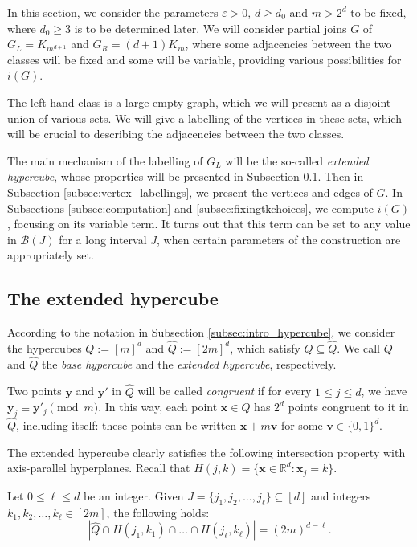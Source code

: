 \documentclass[10pt,a4paper]{article}
\numberwithin{equation}{section}
\newcommand{\rr}{\mathbb{R}}
\newcommand{\eps}{\varepsilon}
\newcommand{\cB}{\mathcal{B}}
\begin{document}
In this section, we consider the parameters $\eps>0$, $d\ge d_0$ and $m>2^d$ to be fixed, where $d_0\ge 3$ is to be determined later. We will consider partial joins $G$ of $G_L=\overline{K_{m^{d+1}}}$ and $G_R=(d+1)K_m$, where some adjacencies between the two classes will be fixed and some will be variable, providing various possibilities for $i(G)$.

The left-hand class is a large empty graph, which we will present as a disjoint union of various sets. We will give a labelling of the vertices in these sets, which will be crucial to describing the adjacencies between the two classes.

The main mechanism of the labelling of $G_L$ will be the so-called \textit{extended hypercube}, whose properties will be presented in Subsection \ref{subsec:extended_hypercube}. Then in Subsection \ref{subsec:vertex_labellings}, we present the vertices and edges of $G$. In Subsections \ref{subsec:computation} and \ref{subsec:fixingtkchoices}, we compute $i(G)$, focusing on its variable term. It turns out that this term can be set to any value in $\cB(J)$ for a long interval $J$, when certain parameters of the construction are appropriately set.

\subsection{The extended hypercube}\label{subsec:extended_hypercube}

According to the notation in Subsection \ref{subsec:intro_hypercube}, we consider the hypercubes $Q:=[m]^d$ and $\widehat{Q}:=[2m]^d$, which satisfy $Q\subseteq \widehat{Q}$. We call $Q$ and $\widehat{Q}$ the \textit{base hypercube} and the \textit{extended hypercube}, respectively.

Two points $\mathbf{y}$ and $\mathbf{y}'$ in $\widehat{Q}$ will be called \textit{congruent} if for every $1\le j\le d$, we have $\mathbf{y}_j\equiv \mathbf{y}'_j\pmod{m}$. In this way, each point $\mathbf{x}\in Q$ has $2^d$ points congruent to it in $\widehat{Q}$, including itself: these points can be written $\mathbf{x}+m\mathbf{v}$ for some $\mathbf{v}\in \{0,1\}^d$.

The extended hypercube clearly satisfies the following intersection property with axis-parallel hyperplanes. Recall that $H(j,k)=\{\mathbf{x}\in \rr^d: \mathbf{x}_j=k\}$.
\begin{observation}\label{obs:hypercube_int_property}
Let $0\le \ell\le d$ be an integer. Given $J=\{j_1, j_2, \ldots, j_{\ell}\}\subseteq [d]$ and integers $k_1, k_2, \ldots, k_{\ell}\in [2m]$, the following holds:
\begin{equation*}
|\widehat{Q}\cap H(j_1, k_1)\cap \ldots\cap H(j_{\ell},k_{\ell})|=(2m)^{d-\ell}.
\end{equation*}
\end{observation}
\end{document}
